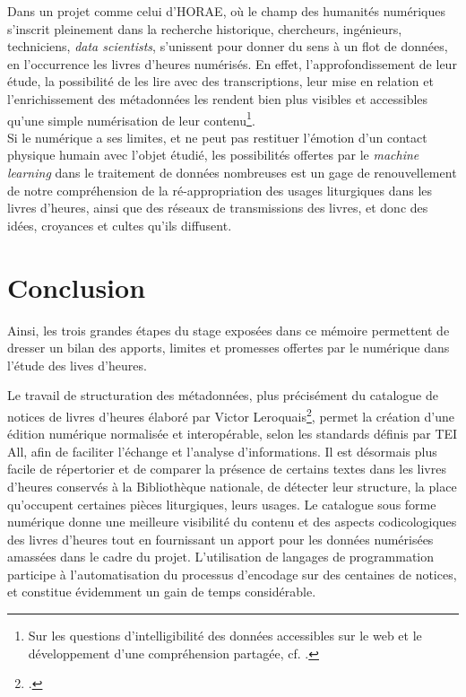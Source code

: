 \documentclass[a4paper,12pt,twoside]{book}
\begin{document}
	Dans un projet comme celui d'HORAE, où le champ des humanités numériques s'inscrit pleinement dans la recherche historique, chercheurs, ingénieurs, techniciens, \textit{data scientists}, s'unissent pour donner du sens à un flot de données, en l'occurrence les livres d'heures numérisés. En effet, l'approfondissement de leur étude, la possibilité de les lire avec des transcriptions, leur mise en relation et l'enrichissement des métadonnées les rendent bien plus visibles et accessibles qu'une simple numérisation de leur contenu\footnote{Sur les questions d'intelligibilité des données accessibles sur le web et le développement d'une compréhension partagée, cf. \cite[p. 38-60]{switching_codes}.}. \\
	
	Si le numérique a ses limites, et ne peut pas restituer l'émotion d'un contact physique humain avec l'objet étudié, les possibilités offertes par le \textit{machine learning} dans le traitement de données nombreuses est un gage de renouvellement de notre compréhension de la ré-appropriation des usages liturgiques dans les livres d'heures, ainsi que des réseaux de transmissions des livres, et donc des idées, croyances et cultes qu'ils diffusent.

	
	\chapter*{Conclusion}
	
	Ainsi, les trois grandes étapes du stage exposées dans ce mémoire permettent de dresser un bilan des apports, limites et promesses offertes par le numérique dans l'étude des lives d'heures. 
	
	Le travail de structuration des métadonnées, plus précisément du catalogue de notices de livres d'heures élaboré par Victor Leroquais\footcite{Leroquais_notices}, permet la création d'une édition numérique normalisée et interopérable, selon les standards définis par TEI All, afin de faciliter l'échange et l'analyse d'informations. Il est désormais plus facile de répertorier et de comparer la présence de certains textes dans les livres d'heures conservés à la Bibliothèque nationale, de détecter leur structure, la place qu'occupent certaines pièces liturgiques, leurs usages. Le catalogue sous forme numérique donne une meilleure visibilité du contenu et des aspects codicologiques des livres d'heures tout en fournissant un apport pour les données numérisées amassées dans le cadre du projet. L'utilisation de langages de programmation participe à l'automatisation du processus d'encodage sur des centaines de notices, et constitue évidemment un gain de temps considérable. 
	
\end{document}

